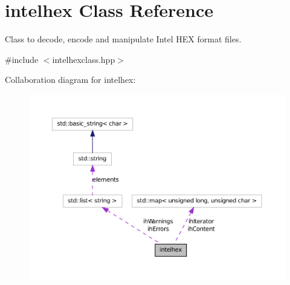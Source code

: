 \hypertarget{classintelhex}{
\section{intelhex Class Reference}
\label{classintelhex}
}


Class to decode, encode and manipulate Intel HEX format files.  




{\ttfamily \#include $<$intelhexclass.hpp$>$}



Collaboration diagram for intelhex:
\nopagebreak
\begin{figure}[H]
\begin{center}
\leavevmode
\includegraphics[width=400pt]{classintelhex__coll__graph}
\end{center}
\end{figure}
